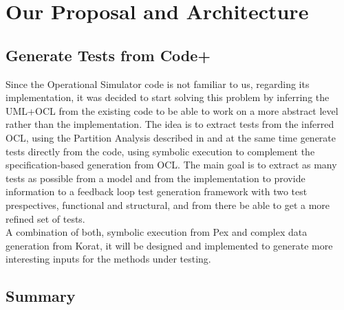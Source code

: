 \chapter{Our Proposal and Architecture}
{}

\section{Generate Tests from Code+}\label{proposal}
Since the Operational Simulator code is not familiar to us, regarding its implementation, it was decided to start solving this problem by inferring the \ac{UML}+\ac{OCL} from the existing code
to be able to work on a more abstract level rather than the implementation.
The idea is to extract tests from the inferred \ac{OCL}, using the Partition Analysis described
in \cite{Benattou02generatingtest} and at the same time generate tests directly from the code, using symbolic execution to complement
the specification-based generation from \ac{OCL}. The main goal is to extract as many tests as possible from a model and from the implementation 
to provide information to a feedback loop\cite{Xie03mutuallyenhancing}
test generation framework with two test prespectives, functional and structural, and from there be able to get a more refined set of tests.\\
A combination of both, symbolic execution from Pex and complex data generation from Korat, it will be designed and implemented to
generate more interesting inputs for the methods under testing.
\section{Summary}
\secendnote
